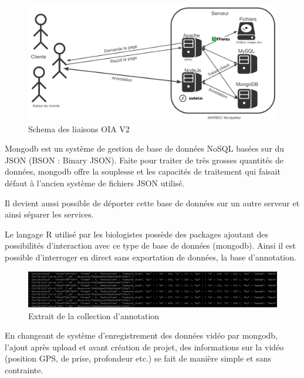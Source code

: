 \documentclass[12pt]{article}
\begin{document}
\begin{figure}[H]
\centering
\includegraphics[width=1\textwidth]{img/oia_v2_schema.png}
 \caption{Schema des liaisons OIA V2}
 \label{fig:schema_liaison_v2}
\end{figure}

Mongodb est un système de gestion de base de données NoSQL basées sur du JSON (BSON : Binary JSON). Faite pour traiter de très grosses quantités de données, mongodb offre la souplesse et les capacités de traitement qui faisait défaut à l’ancien système de fichiers JSON utilisé.
\par
Il devient aussi possible de déporter cette base de données sur un autre serveur et ainsi séparer les services.
\par
Le langage R utilisé par les biologistes possède des packages ajoutant des possibilités d’interaction avec ce type de base de données (mongodb). Ainsi il est possible d’interroger en direct sans exportation de données, la base d’annotation.

\begin{figure}[H]
\centering
\includegraphics[width=1\textwidth]{img/OIA_V2/oia_v2_05.png}
 \caption{Extrait de la collection d'annotation}
 \label{fig:collection_anno}
\end{figure}

\par
En changeant de système d’enregistrement des données vidéo par mongodb, l’ajout après upload et avant création de projet, des informations sur la vidéo (position GPS, de prise, profondeur etc.) se fait de manière simple et sans contrainte.
\end{document}
